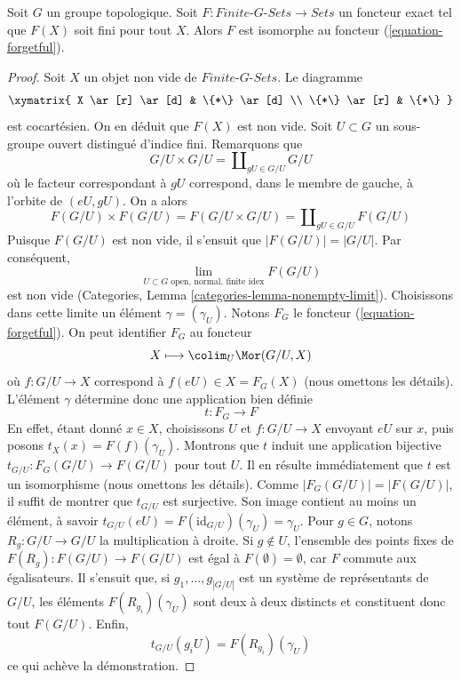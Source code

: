 \begin{lemma}
\label{lemma-second-fundamental-functor}
Soit $G$ un groupe topologique. Soit
$F : \textit{Finite-}G\textit{-Sets} \to \textit{Sets}$
un foncteur exact tel que $F(X)$ soit fini pour tout $X$.
Alors $F$ est isomorphe au foncteur (\ref{equation-forgetful}).
\end{lemma}

\begin{proof}
Soit $X$ un objet non vide de $\textit{Finite-}G\textit{-Sets}$. Le diagramme
$$
\xymatrix{
X \ar[r] \ar[d] & \{*\} \ar[d] \\
\{*\} \ar[r] & \{*\}
}
$$
est cocartésien. On en déduit que $F(X)$ est non vide.
Soit $U \subset G$ un sous-groupe ouvert distingué d'indice fini. Remarquons que
$$
G/U \times G/U = \coprod\nolimits_{gU \in G/U} G/U
$$
où le facteur correspondant à $gU$ correspond, dans le membre de gauche, à
l'orbite de $(eU, gU)$. On a alors
$$
F(G/U) \times F(G/U) = F(G/U \times G/U) = \coprod\nolimits_{gU \in G/U} F(G/U)
$$
Puisque $F(G/U)$ est non vide, il s'ensuit que
$|F(G/U)| = |G/U|$. Par conséquent,
$$
\lim_{U \subset G\text{ open, normal, finite idex}} F(G/U)
$$
est non vide (Categories, Lemma \ref{categories-lemma-nonempty-limit}).
Choisissons dans cette limite un élément $\gamma = (\gamma_U)$.
Notons $F_G$ le foncteur (\ref{equation-forgetful}). On peut identifier
$F_G$ au foncteur
$$
X \longmapsto \colim_U \Mor(G/U, X)
$$
où $f : G/U \to X$ correspond à $f(eU) \in X = F_G(X)$
(nous omettons les détails). L'élément $\gamma$ détermine donc une
application bien définie
$$
t : F_G \longrightarrow F
$$
En effet, étant donné $x \in X$, choisissons $U$ et
$f : G/U \to X$ envoyant $eU$ sur $x$, puis posons
$t_X(x) = F(f)(\gamma_U)$. Montrons que $t$ induit une application bijective
$t_{G/U} : F_G(G/U) \to F(G/U)$ pour tout $U$. Il en résulte immédiatement
que $t$ est un isomorphisme (nous omettons les détails).
Comme $|F_G(G/U)| = |F(G/U)|$, il suffit de montrer que $t_{G/U}$ est
surjective. Son image contient au moins un élément, à savoir
$t_{G/U}(eU) = F(\text{id}_{G/U})(\gamma_U) = \gamma_U$.
Pour $g \in G$, notons $R_g : G/U \to G/U$ la multiplication à droite.
Si $g \not \in U$, l'ensemble des points fixes de
$F(R_g) : F(G/U) \to F(G/U)$ est égal à
$F(\emptyset) = \emptyset$, car $F$ commute aux égalisateurs. Il s'ensuit que,
si $g_1, \ldots, g_{|G/U|}$ est un système de représentants de $G/U$, les
éléments $F(R_{g_i})(\gamma_U)$ sont deux à deux distincts et constituent
donc tout $F(G/U)$. Enfin,
$$
t_{G/U}(g_iU) = F(R_{g_i})(\gamma_U)
$$
ce qui achève la démonstration.
\end{proof}

